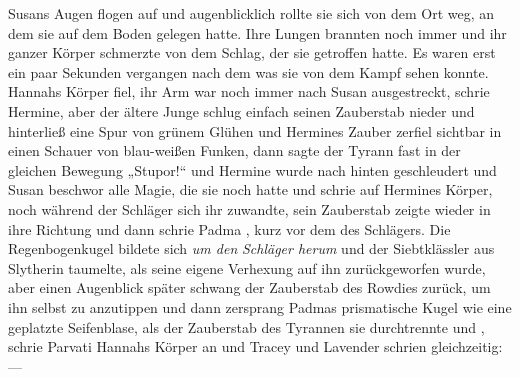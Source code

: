 Susans Augen flogen auf und augenblicklich rollte sie sich von dem Ort weg, an dem sie auf dem Boden gelegen hatte. Ihre Lungen brannten noch immer und ihr ganzer Körper schmerzte von dem Schlag, der sie getroffen hatte. Es waren erst ein paar Sekunden vergangen nach dem was sie von dem Kampf sehen konnte. Hannahs Körper fiel, ihr Arm war noch immer nach Susan ausgestreckt,  schrie Hermine, aber der ältere Junge schlug einfach seinen Zauberstab nieder und hinterließ eine Spur von grünem Glühen und Hermines Zauber zerfiel sichtbar in einen Schauer von blau-weißen Funken, dann sagte der Tyrann fast in der gleichen Bewegung „Stupor!“ und Hermine wurde nach hinten geschleudert und Susan beschwor alle Magie, die sie noch hatte und schrie  auf Hermines Körper, noch während der Schläger sich ihr zuwandte, sein Zauberstab zeigte wieder in ihre Richtung und dann schrie Padma , kurz vor dem  des Schlägers. Die Regenbogenkugel bildete sich \emph{um den} \emph{Schläger herum} und der Siebtklässler aus Slytherin taumelte, als seine eigene Verhexung auf ihn zurückgeworfen wurde, aber einen Augenblick später schwang der Zauberstab des Rowdies zurück, um ihn selbst zu anzutippen und dann zersprang Padmas prismatische Kugel wie eine geplatzte Seifenblase, als der Zauberstab des Tyrannen sie durchtrennte und , schrie Parvati Hannahs Körper an und Tracey und Lavender schrien gleichzeitig: —

